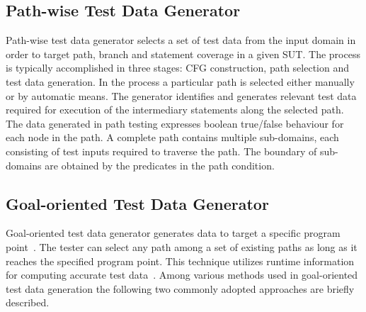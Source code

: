 \subsection{Path-wise Test Data Generator} 
\label{sec:pathwise_2}
Path-wise test data generator selects a set of test data from the input domain in order to target path, branch and statement coverage in a given SUT. The process is typically accomplished in three stages: CFG construction, path selection and test data generation. In the process a particular path is selected either manually or by automatic means. The generator identifies and generates relevant test data required for execution of the intermediary statements along the selected path. The data generated in path testing expresses boolean true/false behaviour for each node in the path. A complete path contains multiple sub-domains, each consisting of test inputs required to traverse the path. The boundary of sub-domains are obtained by the predicates in the path condition. %



\subsection{Goal-oriented Test Data Generator}
\label{sec:goaloriented_2}
Goal-oriented test data generator generates data to target a specific program point~\cite{chungautomated}. The tester can select any path among a set of existing paths as long as it reaches the specified program point. This technique utilizes runtime information for computing accurate test data~\cite{ferguson1996chaining}. Among various methods used in goal-oriented test data generation the following two commonly adopted approaches are briefly described.

